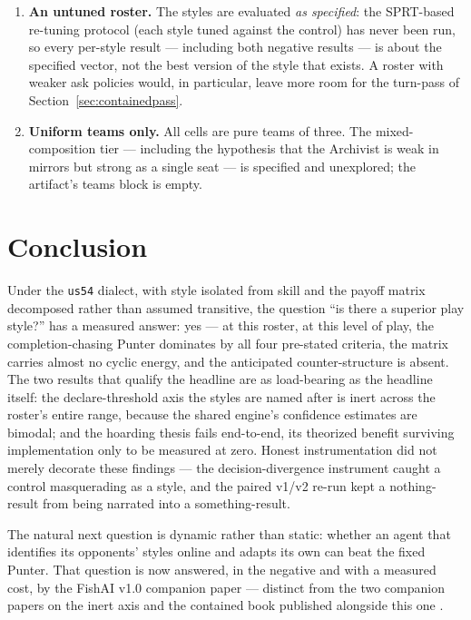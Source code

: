 \documentclass[11pt]{article}
\newcommand{\code}[1]{\texttt{#1}}
\newcommand{\usff}{\code{us54}}
\begin{document}
\begin{enumerate}
  pinned by the artifact's rules hash. The sign-flip analysis is itself evidence that results
  do not transfer across dialects; nothing here is claimed for the 48-card game.
\item \textbf{An untuned roster.} The styles are evaluated \emph{as specified}: the
  SPRT-based re-tuning protocol (each style tuned against the control) has never been run, so
  every per-style result --- including both negative results --- is about the specified
  vector, not the best version of the style that exists. A roster with weaker ask policies
  would, in particular, leave more room for the turn-pass of
  Section~\ref{sec:containedpass}.
\item \textbf{Uniform teams only.} All cells are pure teams of three. The mixed-composition
  tier --- including the hypothesis that the Archivist is weak in mirrors but strong as a
  single seat --- is specified and unexplored; the artifact's teams block is empty.
\end{enumerate}

\section{Conclusion}
\label{sec:conclusion}

Under the \usff{} dialect, with style isolated from skill and the payoff matrix decomposed
rather than assumed transitive, the question ``is there a superior play style?'' has a
measured answer: yes --- at this roster, at this level of play, the completion-chasing Punter
dominates by all four pre-stated criteria, the matrix carries almost no cyclic energy, and
the anticipated counter-structure is absent. The two results that qualify the headline are as
load-bearing as the headline itself: the declare-threshold axis the styles are named after is
inert across the roster's entire range, because the shared engine's confidence estimates are
bimodal; and the hoarding thesis fails end-to-end, its theorized benefit surviving
implementation only to be measured at zero. Honest instrumentation did not merely decorate
these findings --- the decision-divergence instrument caught a control masquerading as a
style, and the paired v1/v2 re-run kept a nothing-result from being narrated into a
something-result.

The natural next question is dynamic rather than static: whether an agent that identifies its
opponents' styles online and adapts its own can beat the fixed Punter. That question is now
answered, in the negative and with a measured cost, by the FishAI v1.0 companion paper
\cite{adaptivepaper} --- distinct from the two companion papers on the inert axis and
the contained book published alongside this one \cite{inertpaper,containedpaper}.
\end{document}
